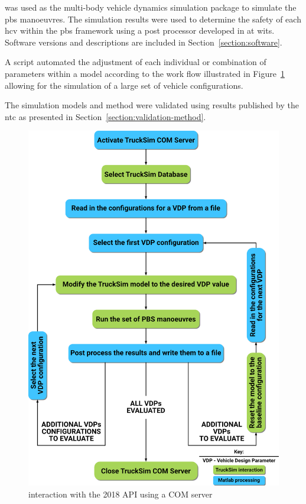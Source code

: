 \trucksim{} was used as the multi-body vehicle dynamics simulation package to simulate the \gls{pbs} manoeuvres. The simulation results were used to determine the safety of each \gls{hcv} within the \gls{pbs} framework using a post processor developed in \matlab{} at \gls{wits}. Software versions and descriptions are included in Section~\ref{section:software}.

A \matlab{} script automated the adjustment of each individual or combination of parameters within a \trucksim{} model according to the work flow illustrated in Figure~\ref{figure:matlab-trucksim-api-interaction} allowing for the simulation of a large set of vehicle configurations.

The simulation models and method were validated using results published by the \gls{ntc} as presented in Section~\ref{section:validation-method}.

\begin{figure}[H]
	\centering
	\includegraphics[width=1\textwidth]{fig/2018-03-23_trucksim-com-server-flowchart}
	\caption{\matlab{} interaction with the \trucksim{} 2018 API using a COM server}
	\label{figure:matlab-trucksim-api-interaction}
\end{figure}

